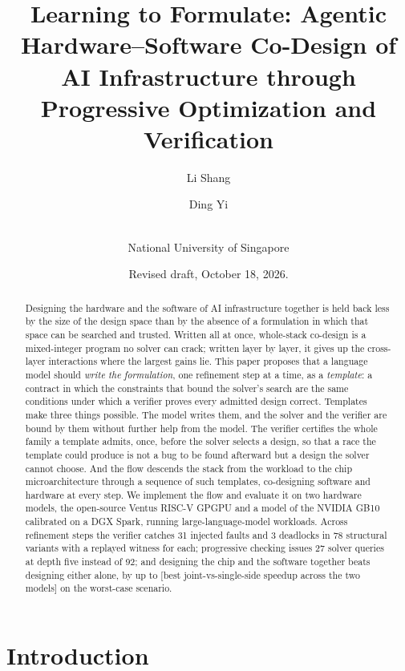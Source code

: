 \documentclass[11pt]{article}
\title{Learning to Formulate: Agentic Hardware--Software Co-Design of AI Infrastructure through Progressive Optimization and Verification}
\author{Li Shang \and Ding Yi \and \pending{further authors}\\[0.3em]
\small National University of Singapore}
\date{Revised draft, October 18, 2026.}
\newcommand{\pending}[1]{\textcolor{red!65!black}{[#1]}}
\begin{document}
\maketitle

\begin{abstract}
Designing the hardware and the software of AI infrastructure together is held back less by the size of the design space than by the absence of a formulation in which that space can be searched and trusted. Written all at once, whole-stack co-design is a mixed-integer program no solver can crack; written layer by layer, it gives up the cross-layer interactions where the largest gains lie. This paper proposes that a language model should \emph{write the formulation}, one refinement step at a time, as a \emph{template}: a contract in which the constraints that bound the solver's search are the same conditions under which a verifier proves every admitted design correct. Templates make three things possible. The model writes them, and the solver and the verifier are bound by them without further help from the model. The verifier certifies the whole family a template admits, once, before the solver selects a design, so that a race the template could produce is not a bug to be found afterward but a design the solver cannot choose. And the flow descends the stack from the workload to the chip microarchitecture through a sequence of such templates, co-designing software and hardware at every step. We implement the flow and evaluate it on two hardware models, the open-source Ventus RISC-V GPGPU and a model of the NVIDIA GB10 calibrated on a DGX Spark, running large-language-model workloads. Across refinement steps the verifier catches 31 injected faults and 3 deadlocks in 78 structural variants with a replayed witness for each; progressive checking issues 27 solver queries at depth five instead of 92; and designing the chip and the software together beats designing either alone, by up to \pending{best joint-vs-single-side speedup across the two models} on the worst-case scenario.
\end{abstract}

\section{Introduction}\label{sec:intro}
\end{document}

